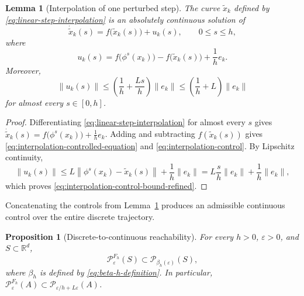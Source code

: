 \documentclass[pdflatex,sn-mathphys-num]{sn-jnl}
\numberwithin{equation}{section}
\theoremstyle{thmstyleone}%
\newtheorem{proposition}[theorem]{Proposition}
\newtheorem{lemma}[theorem]{Lemma}
\theoremstyle{definition}
\theoremstyle{remark}
\begin{document}
\begin{lemma}[Interpolation of one perturbed step]
\label{lem:discrete-step-interpolation}
The curve $\widetilde x_k$ defined by \eqref{eq:linear-step-interpolation} is an absolutely continuous solution of \begin{equation}
\label{eq:interpolation-controlled-equation}
    \dot{\widetilde x}_k(s)
    =
    f\bigl(\widetilde x_k(s)\bigr)+u_k(s),
    \qquad 0\leq s\leq h,
\end{equation}
where
\begin{equation}
\label{eq:interpolation-control}
    u_k(s)
    =
    f\bigl(\phi^s(x_k)\bigr)
    -
    f\bigl(\widetilde x_k(s)\bigr)
    +
    \frac1h e_k.
\end{equation}
Moreover,
\begin{equation}
\label{eq:interpolation-control-bound-refined}
    \|u_k(s)\|
    \leq
    \left(\frac1h+\frac{Ls}{h}\right)\|e_k\|
    \leq
    \left(\frac1h+L\right)\|e_k\|
\end{equation}
for almost every $s\in[0,h]$.
\end{lemma}

\begin{proof}
Differentiating \eqref{eq:linear-step-interpolation} for almost every $s$ gives
    $\dot{\widetilde x}_k(s)
    =
    f\bigl(\phi^s(x_k)\bigr)+\frac1h e_k$. Adding and subtracting $f(\widetilde x_k(s))$ gives \eqref{eq:interpolation-controlled-equation} and \eqref{eq:interpolation-control}. By Lipschitz continuity,
\[
    \|u_k(s)\|
    \leq
    L\left\|
    \phi^s(x_k)-\widetilde x_k(s)
    \right\|
    +\frac1h\|e_k\|=
    L\frac{s}{h}\|e_k\|
    +\frac1h\|e_k\|,
\]
which proves \eqref{eq:interpolation-control-bound-refined}.
\end{proof}

Concatenating the controls from Lemma~\ref{lem:discrete-step-interpolation} produces an admissible continuous control over the entire discrete trajectory.

\begin{proposition}[Discrete-to-continuous reachability]
\label{prop:discrete-to-continuous}
For every $h>0$, $\varepsilon>0$, and $S\subset\mathbb R^d$,
\begin{equation}
\label{eq:discrete-to-continuous-inclusion}
    \mathcal P_\varepsilon^{F_h}(S)
    \subset
    \mathcal P_{\beta_h(\varepsilon)}(S),
\end{equation}
where $\beta_h$ is defined by \eqref{eq:beta-h-definition}. In particular,
    $\mathcal P_\varepsilon^{F_h}(A)
    \subset
    \mathcal P_{\varepsilon/h+L\varepsilon}(A)$.
\end{proposition}
\end{document}
